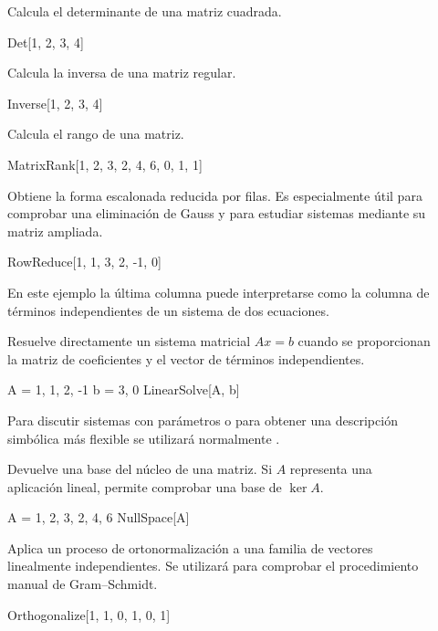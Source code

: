 \begin{description}

\item[] Calcula el determinante de una matriz cuadrada.
\begin{mathematicacode}
Det[{{1, 2}, {3, 4}}]
\end{mathematicacode}

\item[] Calcula la inversa de una matriz regular.
\begin{mathematicacode}
Inverse[{{1, 2}, {3, 4}}]
\end{mathematicacode}

\item[] Calcula el rango de una matriz.
\begin{mathematicacode}
MatrixRank[{{1, 2, 3}, {2, 4, 6}, {0, 1, 1}}]
\end{mathematicacode}

\item[] Obtiene la forma escalonada reducida por filas. Es especialmente útil para comprobar una eliminación de Gauss y para estudiar sistemas mediante su matriz ampliada.
\begin{mathematicacode}
RowReduce[{{1, 1, 3}, {2, -1, 0}}]
\end{mathematicacode}
En este ejemplo la última columna puede interpretarse como la columna de términos independientes de un sistema de dos ecuaciones.

\item[] Resuelve directamente un sistema matricial $Ax=b$ cuando se proporcionan la matriz de coeficientes y el vector de términos independientes.
\begin{mathematicacode}
A = {{1, 1}, {2, -1}}
b = {3, 0}
LinearSolve[A, b]
\end{mathematicacode}
Para discutir sistemas con parámetros o para obtener una descripción simbólica más flexible se utilizará normalmente .

\item[] Devuelve una base del núcleo de una matriz. Si $A$ representa una aplicación lineal, permite comprobar una base de $\ker A$.
\begin{mathematicacode}
A = {{1, 2, 3}, {2, 4, 6}}
NullSpace[A]
\end{mathematicacode}

\item[] Aplica un proceso de ortonormalización a una familia de vectores linealmente independientes. Se utilizará para comprobar el procedimiento manual de Gram--Schmidt.
\begin{mathematicacode}
Orthogonalize[{{1, 1, 0}, {1, 0, 1}}]
\end{mathematicacode}


\end{description}
